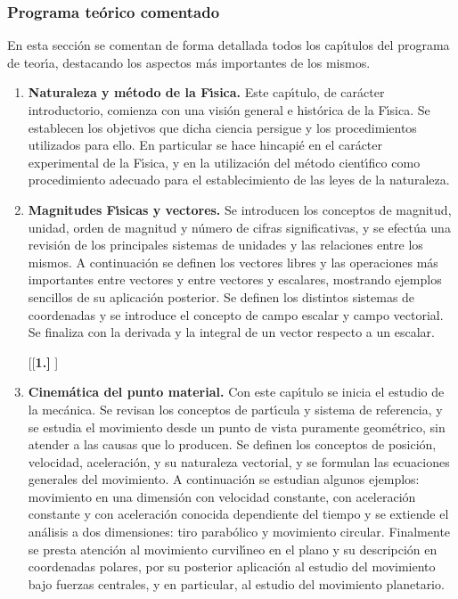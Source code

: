 \begin{enumerate}[{\bf 1. }]
\end{enumerate}



\newpage
\subsubsection{\large Programa te\'{o}rico comentado}

En esta secci\'{o}n se comentan de forma detallada todos los
 cap\'{\i}tulos del programa de teor\'{\i}a,
 destacando los aspectos m\'{a}s importantes de los mismos.\\

\begin{enumerate} [{\bf 1. }]


\item  {\bf  Naturaleza y m\'{e}todo de la F\'{\i}sica.}
Este cap\'{\i}tulo, de car\'{a}cter introductorio, comienza con una
 visi\'{o}n general e hist\'{o}rica de la F\'{\i}sica. Se establecen los
 objetivos que dicha ciencia persigue y los procedimientos utilizados para ello.
 En particular se hace hincapi\'{e} en el car\'{a}cter experimental de la F\'{\i}sica,
 y en la utilizaci\'{o}n del m\'{e}todo cient\'{\i}fico como procedimiento
 adecuado para el establecimiento de las leyes de la naturaleza. 


\item {\bf  Magnitudes F\'{\i}sicas y vectores.}
Se introducen los conceptos de magnitud, unidad,
 orden de magnitud y n\'{u}mero de cifras significativas, y se efect\'{u}a
 una revisi\'{o}n de los principales sistemas de unidades y las relaciones
 entre los mismos. A continuaci\'{o}n
se definen los vectores libres y las operaciones m\'{a}s importantes entre 
vectores y entre vectores y escalares, mostrando ejemplos sencillos de 
su aplicaci\'{o}n posterior. Se definen los distintos sistemas de 
coordenadas y se introduce el concepto de campo escalar y campo vectorial.
Se finaliza con la derivada y la integral de un vector respecto a un escalar.



[{[\bf 1.] }]
\item {\bf Cinem\'{a}tica del punto material.}
Con este cap\'{\i}tulo se inicia el estudio de la mec\'{a}nica. 
Se revisan los conceptos de part\'{\i}cula y sistema de referencia, y se estudia 
el movimiento desde un punto de vista puramente geom\'{e}trico, sin atender
a las causas que lo producen.
Se definen los conceptos de posici\'{o}n, velocidad,  aceleraci\'{o}n,
y su naturaleza vectorial,  y se formulan las ecuaciones 
generales del movimiento. A continuaci\'{o}n se estudian algunos ejemplos: movimiento
 en una dimensi\'{o}n con velocidad constante, con aceleraci\'{o}n constante y
 con aceleraci\'{o}n conocida dependiente del tiempo y se extiende el an\'{a}lisis a 
dos dimensiones: tiro parab\'{o}lico y movimiento circular.
Finalmente se presta atenci\'{o}n al movimiento curvil\'{\i}neo en el plano y 
su descripci\'{o}n en coordenadas polares, por su posterior aplicaci\'{o}n al estudio
del movimiento bajo fuerzas centrales, y en particular, al estudio del movimiento
planetario.



\end{enumerate}
